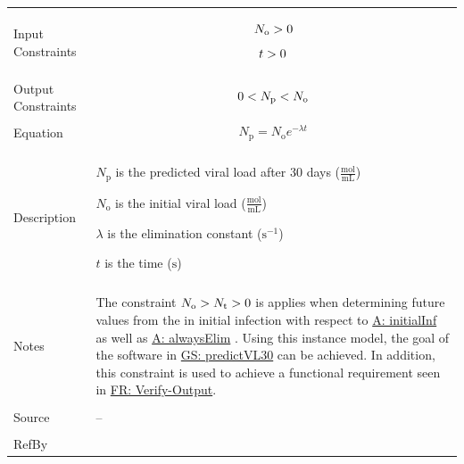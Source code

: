 \documentclass[12pt]{article}
\newcommand{\gt}{\ensuremath >}
\newcommand{\lt}{\ensuremath <}
\begin{document}
\begin{minipage}{\textwidth}
\begin{tabular}{>{\raggedright}p{}>{\raggedright\arraybackslash}p{}}
\\ \midrule \\
Input Constraints & \begin{displaymath}
                    {N_{\text{o}}}\gt{}0
                    \end{displaymath}
                    \begin{displaymath}
                    t\gt{}0
                    \end{displaymath}
\\ \midrule \\
Output Constraints & \begin{displaymath}
                     0\lt{}{N_{\text{p}}}\lt{}{N_{\text{o}}}
                     \end{displaymath}
\\ \midrule \\
Equation & \begin{displaymath}
           {N_{\text{p}}}={N_{\text{o}}} e^{-λ t}
           \end{displaymath}
\\ \midrule \\
Description & \begin{symbDescription}
              \item{${N_{\text{p}}}$ is the predicted viral load after 30 days ($\frac{\text{mol}}{\text{mL}}$)}
              \item{${N_{\text{o}}}$ is the initial viral load ($\frac{\text{mol}}{\text{mL}}$)}
              \item{$λ$ is the elimination constant ($\text{s}^{-1}$)}
              \item{$t$ is the time (${\text{s}}$)}
              \end{symbDescription}
\\ \midrule \\
Notes & The constraint ${N_{\text{o}}}\gt{}{N_{\text{t}}}\gt{}0$ is  applies when determining future values from the in initial infection with respect to \hyperref[initialInf]{A: initialInf} as well as  \hyperref[alwaysElim]{A: alwaysElim} . Using this instance model, the goal of the software in  \hyperref[predictVL30]{GS: predictVL30}  can be achieved. In addition, this constraint is used to achieve a functional requirement seen in  \hyperref[verifyOutput]{FR: Verify-Output}.
        
\\ \midrule \\
Source & --
         
\\ \midrule \\
RefBy & 
\\ \bottomrule
\end{tabular}
\end{minipage}
\end{document}
